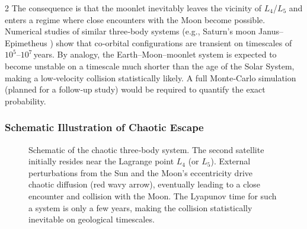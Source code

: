 \documentclass[11pt,a4paper]{article}
\begin{document}
\begin{multicols}{2}
		The consequence is that the moonlet inevitably leaves the vicinity of 
		\(L_4\)/\(L_5\) and enters a regime where close encounters with the Moon 
		become possible.  Numerical studies of similar three‑body systems 
		(e.g., Saturn’s moon Janus–Epimetheus \cite{JanusEpimetheus}) show that co‑orbital configurations 
		are transient on timescales of \(10^{5}\)–\(10^{7}\) years.  
		By analogy, the Earth–Moon–moonlet system is expected to become unstable on a timescale much shorter than the age of the Solar System, making a low‑velocity collision statistically likely. A full Monte‑Carlo simulation (planned for a follow‑up study) would be required to quantify the exact probability.
		
		\subsubsection{Schematic Illustration of Chaotic Escape}
		
		\begin{figure}[H]
			\centering
			\caption{Schematic of the chaotic three‑body system.  The second satellite 
				initially resides near the Lagrange point \(L_4\) (or \(L_5\)).  
				External perturbations from the Sun and the Moon’s eccentricity drive 
				chaotic diffusion (red wavy arrow), eventually leading to a close encounter 
				and collision with the Moon.  The Lyapunov time for such a system is 
				only a few years, making the collision statistically inevitable on 
				geological timescales.}
			\label{fig:threebody}
		\end{figure}
		

\end{multicols}
\end{document}
